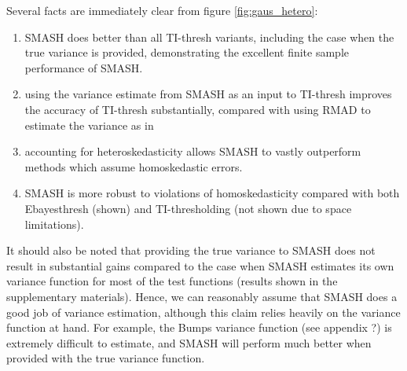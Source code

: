 \documentclass[12pt]{article}
\begin{document}
Several facts are immediately clear from figure \ref{fig:gaus_hetero}: 
\begin{enumerate}
\item SMASH does better than all TI-thresh variants, including the case when the true variance is provided, demonstrating the excellent finite sample performance of SMASH.
\item using the variance estimate from SMASH as an input to TI-thresh improves the accuracy of TI-thresh substantially, compared with using RMAD to estimate the variance as in \cite{Gao1997Wavelet}
\item accounting for heteroskedasticity allows SMASH to vastly outperform methods which assume homoskedastic errors.
\item SMASH is more robust to violations of homoskedasticity compared with both Ebayesthresh (shown) and TI-thresholding (not shown due to space limitations).
\end{enumerate}

It should also be noted that providing the true variance to SMASH does not result in substantial gains compared to the case when SMASH estimates its own variance function for most of the test functions (results shown in the supplementary materials). Hence, we can reasonably assume that SMASH does a good job of variance estimation, although this claim relies heavily on the variance function at hand. For example, the Bumps variance function (see appendix ?) is extremely difficult to estimate, and SMASH will perform much better when provided with the true variance function.
\end{document}
